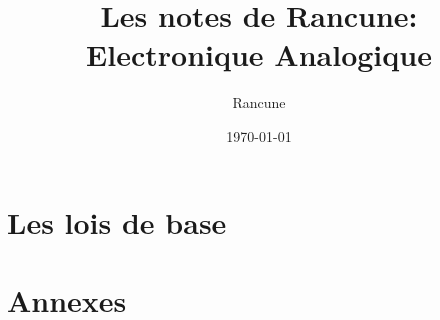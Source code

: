 \documentclass[a4paper,12pt]{book}
\title{Les notes de Rancune: \\Electronique Analogique}
\author{Rancune}
\date{\today}
\begin{document}
\maketitle

\frontmatter

\tableofcontents    

\mainmatter



\part{ Les lois de base }



%
%
%


%
%
%


%
%
%



\part{Annexes}
\appendix



\backmatter

\cleardoublepage
{}
\printindex

\end{document}
